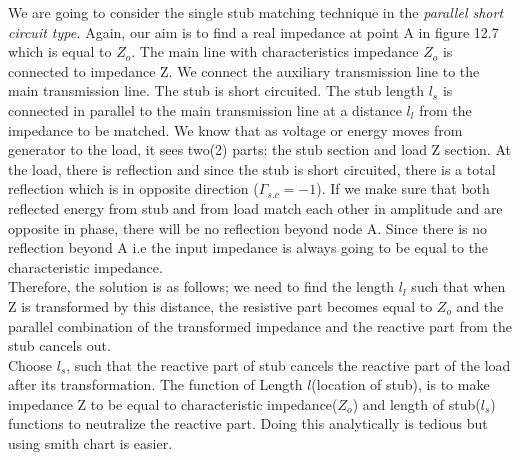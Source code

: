 We are going to consider the single stub matching technique in the\textit{ parallel short circuit type.} Again, our aim is to find a real impedance at point A in figure 12.7 which is equal to $Z_o$. The main line with characteristics impedance $ Z_o$ is connected to impedance Z. We connect the auxiliary transmission line to the main transmission line. The stub is short circuited. The stub length $l_s$ is connected in parallel to the main transmission line at a distance $ l_l$ from the impedance to be matched. We know that as voltage or energy moves from generator to the load, it sees two(2) parts: the stub section and load Z section. At the load, there is  reflection and since the stub is short circuited, there is a total reflection which is in opposite direction ($\Gamma_{s.c} = -1$). If we make sure that both reflected energy from stub and  from load match each other in amplitude and are opposite in phase, there will be no reflection beyond node A. Since there is no reflection beyond A i.e the input impedance is always going to be equal to the characteristic impedance.\\

Therefore, the solution is as follows; we need to find the length $ l_l$  such that when Z is transformed by this distance, the resistive part becomes equal to $Z_o$ and the parallel combination of the transformed impedance and the reactive part from the stub cancels out.\\

Choose $l_s$, such that the reactive part of stub cancels the reactive part of the load after its transformation. The function of Length $l$(location of stub), is to make impedance Z to be equal to characteristic impedance($Z_o$) and length of stub($l_s$) functions to neutralize the reactive part. Doing this analytically  is tedious but using smith chart is easier.\\

